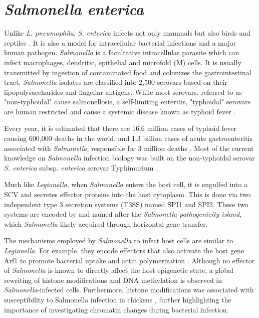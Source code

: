 \section{\textit{Salmonella enterica}}

Unlike \textit{L. pneumophila}, \textit{S. enterica} infects not only mammals but also birds and reptiles \cite{uzzauHostAdaptedSerotypes2000}. It is also a model for intracellular bacterial infections and a major human pathogen. \textit{Salmonella} is a facultative intracellular parasite which can infect macrophages, dendritic, epithelial and microfold (M) cells. It is usually transmitted by ingestion of contaminated food and colonizes the gastrointestinal tract. \textit{Salmonella} isolates are classified into 2,500 serovars based on their lipopolysaccharides and flagellar antigens. While most serovars, referred to as "non-typhoidal" cause salmonellosis, a self-limiting enteritis, "typhoidal" serovars are human restricted and cause a systemic disease known as typhoid fever \cite{larockSalmonellaeInteractionsHost2015}.

Every year, it is estimated that there are 16.6 million cases of typhoid fever causing 600,000 deaths in the world, and 1.3 billion cases of acute gastroenteritis associated with \textit{Salmonella}, responsible for 3 million deaths \cite{pangTyphoidFeverOther1995}. Most of the current knowledge on \textit{Salmonella} infection biology was built on the non-typhoidal serovar \textit{S. enterica} subsp. \textit{enterica} serovar Typhimurium \cite{larockSalmonellaeInteractionsHost2015}. 

Much like \textit{Legionella}, when \textit{Salmonella} enters the host cell, it is engulfed into a \acrfull{SCV}  and secretes effector proteins into the host cytoplasm. This is done via two independent type 3 secretion systems (T3SS) named SPI1 and SPI2. These two systems are encoded by and named after the \textit{Salmonella pathogenicity island}, which \textit{Salmonella} likely acquired through horizontal gene transfer.

The mechanisms employed by \textit{Salmonella} to infect host cells are similar to \textit{Legionella}. For example, they encode effectors that also activate the host gene Arf1 to promote bacterial uptake and actin polymerization \cite{larockSalmonellaeInteractionsHost2015}. Although no effector of \textit{Salmonella} is known to directly affect the host epigenetic state, a global rewriting of histone modifications and DNA methylation \cite{szteinSalmonellaEntericaSerovar2020,wangChickenCecalDNA2020} is observed in \textit{Salmonella}-infected cells. Furthermore, histone modifications was associated with susceptibility to Salmonella infection in chickens \cite{gouEpigeneticModificationTLRs2012}, further highlighting the importance of investigating chromatin changes during bacterial infection.


